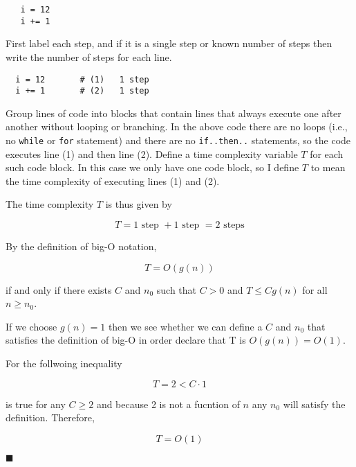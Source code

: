 \documentclass{article}
\begin{document}
\begin{verbatim}
   i = 12
   i += 1
\end{verbatim}

First label each step, and if it is a single step or known number
of steps then write the number of steps for each line.

\begin{verbatim}
  i = 12       # (1)   1 step
  i += 1       # (2)   1 step
\end{verbatim}

Group lines of code into blocks that contain lines that always execute
one after another without looping or branching.  In the above code
there are no loops (i.e., no \verb|while| or \verb|for| statement) and
there are no \verb|if..then..| statements, so the code executes line
(1) and then line (2).  Define a time complexity variable $T$ for each
such code block.  In this case we only have one code block, so I
define $T$ to mean the time complexity of executing lines (1) and (2).

The time complexity $T$ is thus given by

\begin{equation}
  T = 1 \text{ step } + 1 \text{ step } = 2 \text{ steps}
\end{equation}

By the definition of big-O notation,

\begin{equation}
  T = O(g(n))
\end{equation}

if and only if there exists $C$ and $n_0$ such that $C > 0$ and $T
\leq Cg(n)$ for all $n \geq n_0$.

If we choose $g(n) = 1$ then we see whether we can define a $C$ and
$n_0$ that satisfies the definition of big-O in order declare that T
is $O(g(n)) = O(1)$.

For the follwoing inequality

\begin{equation}
  T = 2 < C \cdot 1
\end{equation}

is true for any $C \geq 2$ and because 2 is not a fucntion of $n$ any
$n_0$ will satisfy the definition.  Therefore,

\begin{equation}
  \boxed{T = O(1)}
\end{equation}

$\blacksquare$
\end{document}
